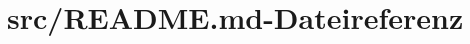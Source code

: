 \hypertarget{_r_e_a_d_m_e_8md}{\section{src/\+R\+E\+A\+D\+M\+E.md-\/\+Dateireferenz}
\label{_r_e_a_d_m_e_8md}
}
